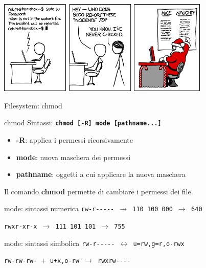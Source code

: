 \documentclass{beamer}
\begin{document}
    \begin{frame}{}
        \centering
        \includegraphics[height=4.5cm, keepaspectratio]{images/sudo-incident.png}
    \end{frame}

    \begin{frame}{Filesystem: chmod}
        \begin{block}{chmod}
            \small
            Sintassi: \texttt{\textbf{chmod [-R] mode [pathname...]}}

            \begin{itemize}
                \item \textbf{-R}: applica i permessi ricorsivamente
                \item \textbf{mode}: nuova maschera dei permessi
                \item \textbf{pathname}: oggetti a cui applicare la nuova maschera
            \end{itemize}

            Il comando \textbf{chmod} permette di cambiare i permessi dei file.
        \end{block}

        \begin{alertblock}{mode: sintassi numerica}
            \small
            \texttt{rw-r-{}-{}-{}-{}- $\rightarrow$ 110 100 000 $\rightarrow$ 640}

            \texttt{rwxr-xr-x $\rightarrow$ 111 101 101 $\rightarrow$ 755}
        \end{alertblock}

        \begin{alertblock}{mode: sintassi simbolica}
            \small
            \texttt{rw-r-{}-{}-{}-{}- $\leftrightarrow$ u=rw,g=r,o-rwx}
        
            \texttt{rw-rw-rw- $+$ u+x,o-rw $\rightarrow$ rwxrw-{}-{}-{}-}
        \end{alertblock}
    \end{frame}
\end{document}
